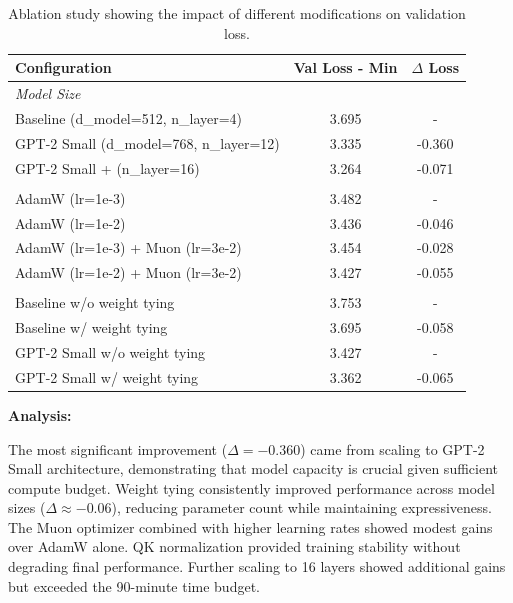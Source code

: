 \begin{answer}
\begin{table}[!htb]
\centering
\caption{Ablation study showing the impact of different modifications on validation loss.}
\label{tab:leaderboard_ablations}
\begin{tabular}{lcc}
\toprule
\textbf{Configuration} & \textbf{Val Loss - Min} & \textbf{$\Delta$ Loss} \\
\midrule
\multicolumn{3}{l}{\textit{Model Size}} \\
\addlinespace[0.5ex]
Baseline (d\_model=512, n\_layer=4) & 3.695 & - \\
GPT-2 Small (d\_model=768, n\_layer=12) & 3.335 & -0.360 \\
GPT-2 Small + (n\_layer=16) & 3.264 & -0.071 \\
\addlinespace[1ex]
\multicolumn{3}{l}{\textit{Optimizer \& Learning Rate (GPT-2 Small)}} \\
\addlinespace[0.5ex]
AdamW (lr=1e-3) & 3.482 & - \\
AdamW (lr=1e-2) & 3.436 & -0.046 \\
AdamW (lr=1e-3) + Muon (lr=3e-2) & 3.454 & -0.028 \\
AdamW (lr=1e-2) + Muon (lr=3e-2) & 3.427 & -0.055 \\
\addlinespace[1ex]
\multicolumn{3}{l}{\textit{Weight Tying}} \\
\addlinespace[0.5ex]
Baseline w/o weight tying & 3.753 & - \\
Baseline w/ weight tying & 3.695 & -0.058 \\
GPT-2 Small w/o weight tying & 3.427 & - \\
GPT-2 Small w/ weight tying & 3.362 & -0.065 \\
\bottomrule
\end{tabular}
\end{table}

\textbf{Analysis:}

The most significant improvement ($\Delta = -0.360$) came from scaling to GPT-2 Small architecture, demonstrating that model capacity is crucial given sufficient compute budget. Weight tying consistently improved performance across model sizes ($\Delta \approx -0.06$), reducing parameter count while maintaining expressiveness. The Muon optimizer combined with higher learning rates showed modest gains over AdamW alone. QK normalization provided training stability without degrading final performance. Further scaling to 16 layers showed additional gains but exceeded the 90-minute time budget.

\end{answer}

